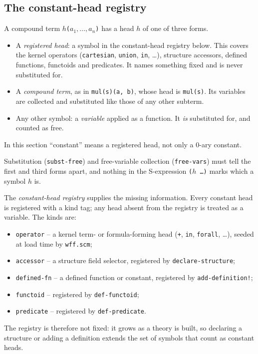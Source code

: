 \subsection{The constant-head registry}
\label{sec:constant-registry}

A compound term \texttt{$h$($a_1,\ldots,a_n$)} has a head $h$ of one
of three forms.
\begin{itemize}
\item A \emph{registered head}: a symbol in the constant-head registry
  below.  This covers the kernel operators (\texttt{cartesian},
  \texttt{union}, \texttt{in}, \ldots), structure accessors, defined
  functions, functoids and predicates.  It names something fixed and is
  never substituted for.
\item A \emph{compound term}, as in \texttt{mul(s)(a, b)}, whose head is
  \texttt{mul(s)}.  Its variables are collected and substituted like
  those of any other subterm.
\item Any other symbol: a \emph{variable} applied as a function.  It
  \emph{is} substituted for, and counted as free.
\end{itemize}
In this section ``constant'' means a registered head, not only a
0-ary constant.

Substitution (\texttt{subst-free}) and free-variable collection
(\texttt{free-vars}) must tell the first and third forms apart, and
nothing in the S-expression \texttt{($h$ \ldots)} marks which a symbol
$h$ is.

The \emph{constant-head registry} supplies the missing information.
Every constant head is registered with a kind tag; any head absent from
the registry is treated as a variable.  The kinds are:
\begin{itemize}
\item \texttt{operator} -- a kernel term- or formula-forming head
  (\texttt{+}, \texttt{in}, \texttt{forall}, \ldots), seeded at load
  time by \texttt{wff.scm};
\item \texttt{accessor} -- a structure field selector, registered by
  \texttt{declare-structure};
\item \texttt{defined-fn} -- a defined function or constant, registered
  by \texttt{add-definition!};
\item \texttt{functoid} -- registered by \texttt{def-functoid};
\item \texttt{predicate} -- registered by \texttt{def-predicate}.
\end{itemize}
The registry is therefore not fixed: it grows as a theory is built, so
declaring a structure or adding a definition extends the set of symbols
that count as constant heads.

